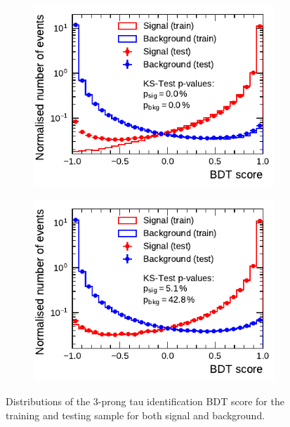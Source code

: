 \begin{figure}[ht]
  \begin{subfigure}[t]{0.48\textwidth}
    \centering
    \includegraphics{./figures/bdt_perf/scores/grid_3p0317.pdf}
  \end{subfigure}
  \begin{subfigure}[t]{0.48\textwidth}
    \centering
    \includegraphics{./figures/bdt_perf/scores/grid_3p0327.pdf}
  \end{subfigure}
  \caption{Distributions of the 3-prong tau identification BDT score for the
    training and testing sample for both signal and background.}
  \label{fig:bdt_ks5_scores}
\end{figure}

